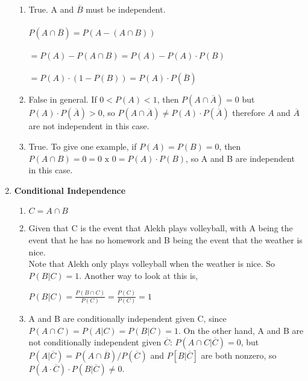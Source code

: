 \documentclass[11pt]{article}
\begin{document}
\begin{enumerate}
\begin{enumerate}
				
				\item True. A and $\overline{B}$ must be independent. \\\\
				$P(A \cap \overline{B}) = P(A - (A \cap B))$ \\\\
				$= P(A) - P(A \cap B) = P(A) - P(A) \cdot P(B)$ \\\\
				$= P(A) \cdot (1 - P(B)) = P(A) \cdot P(\overline{B})$ \\
				
				\item False in general. If $0 < P(A) < 1$, then $P(A \cap \overline{A}) = 0$ but $P(A) \cdot P(\overline{A}) > 0$, so $P(A \cap \overline{A}) \neq P(A) \cdot P(\overline{A})$ therefore $A$ and $\overline{A}$ are not independent in this case. \\
				
				
				\item True. To give one example, if $P(A) = P(B) = 0$, then $P(A \cap B) = 0 = 0 \text{ x } 0 = P(A) \cdot P(B)$,
				so A and B are independent in this case. \\
				
				
			\end{enumerate}
		
		
		\item \textbf{Conditional Independence}
			
			\begin{enumerate}
				
				\item $C = A \cap B$
				
				\item Given that C is the event that Alekh plays volleyball, with A being the event that he has no homework and B being the event that the weather is nice. \\
				Note that Alekh only plays volleyball when the weather is nice. So $P(B \vert C) = 1$. Another way to look at this is,  \\
				\begin{center}
					$P(B \vert C) = \frac{ P(B \cap C) }{P(C)} = \frac{P(C)}{P(C)} = 1$ 
				\end{center}
				
				\item A and B are conditionally independent given C, since $P(A \cap C) = P(A \vert C) = P(B \vert C) = 1$. On the
				other hand, A and B are not conditionally independent given $\overline{C}$: $P(A \cap C \vert \overline{C}) = 0$, but $P(A \vert \overline{C}) = P(A \cap \overline{B})/P(\overline{C})$ and $P[B \vert \overline{C}]$ are both nonzero, so $P(A \cdot \overline{C}) \cdot P(B \vert \overline{C}) \neq 0$.
				
			\end{enumerate}
		
	\end{enumerate}
\end{document}
